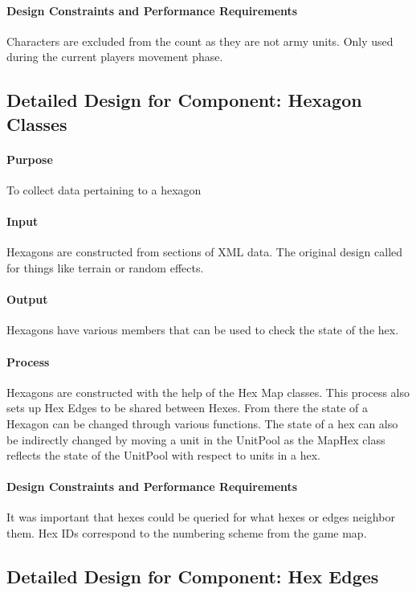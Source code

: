 \documentclass[12pt,a4paper,titlepage]{article}
\begin{document}
\paragraph{Design Constraints and Performance Requirements} Characters are excluded from the count as they are not army units.  Only used during the current players movement phase.  

\subsection{Detailed Design for Component: Hexagon Classes}
\paragraph{Purpose} To collect data pertaining to a hexagon
\paragraph{Input}
Hexagons are constructed from sections of XML data.
The original design called for things like terrain or random effects.
\paragraph{Output}
Hexagons have various members that can be used to check the state of the hex.
\paragraph{Process}
Hexagons are constructed with the help of the Hex Map classes.
This process also sets up Hex Edges to be shared between Hexes.
From there the state of a Hexagon can be changed through various functions.
The state of a hex can also be indirectly changed by moving a unit in the UnitPool
as the MapHex class reflects the state of the UnitPool with respect to units in a hex.
\paragraph{Design Constraints and Performance Requirements}
It was important that hexes could be queried for what hexes or edges neighbor them.
Hex IDs correspond to the numbering scheme from the game map.

\subsection{Detailed Design for Component: Hex Edges}
\end{document}
